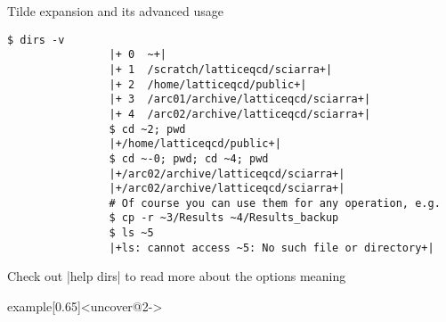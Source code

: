 \begin{frame}[fragile]{Tilde expansion and its advanced usage}
\begin{overlayarea}{\textwidth}{0.6\textheight}
\begin{onlyenv}
\begin{lstlisting}[style=MyBash, aboveskip=3mm]
                $ dirs -v
                |+ 0  ~+|
                |+ 1  /scratch/latticeqcd/sciarra+|
                |+ 2  /home/latticeqcd/public+|
                |+ 3  /arc01/archive/latticeqcd/sciarra+|
                |+ 4  /arc02/archive/latticeqcd/sciarra+|
                $ cd ~2; pwd
                |+/home/latticeqcd/public+|
                $ cd ~-0; pwd; cd ~4; pwd
                |+/arc02/archive/latticeqcd/sciarra+|
                |+/arc02/archive/latticeqcd/sciarra+|
                # Of course you can use them for any operation, e.g.
                $ cp -r ~3/Results ~4/Results_backup
                $ ls ~5
                |+ls: cannot access ~5: No such file or directory+|
            \end{lstlisting}
        \end{onlyenv}
    \end{overlayarea}
    \begin{center}
        Check out \;\bash|help dirs|\; to read more about the options meaning
    \end{center}
    \begin{varblock}{example}[0.65\textwidth]{}<uncover@2->
        \large{}
    \end{varblock}
\end{frame}
